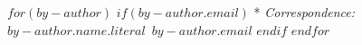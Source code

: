 
$for(by-author)$%
$if(by-author.email)$%
* \textit{Correspondence:}~$by-author.name.literal$~$by-author.email$%
$endif$%
$endfor$
